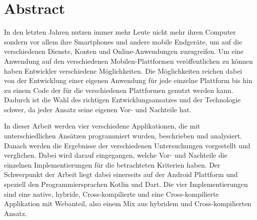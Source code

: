 \chapter*{Abstract}

\bigskip 

In den letzten Jahren nutzen immer mehr Leute nicht mehr ihren Computer sondern vor allem ihre Smartphones und andere mobile Endgeräte, um auf die verschiedenen Dienste, Konten und Online-Anwendungen zuzugreifen. Um eine Anwendung auf den verschiedenen Mobilen-Plattformen veröffentlichen zu können haben Entwickler verschiedene Möglichkeiten. Die Möglichkeiten reichen dabei von der Entwicklung einer eigenen Anwendung für jede einzelne Plattform bis hin zu einem Code der für die verschiedenen Plattformen genutzt werden kann. Dadurch ist die Wahl des richtigen Entwicklungsansatzes und der Technologie schwer, da jeder Ansatz seine eigenen Vor- und Nachteile hat. 

In dieser Arbeit werden vier verschiedene Applikationen, die mit unterschiedlichen Ansätzen programmiert wurden, beschrieben und analysiert. Danach werden die Ergebnisse der verschiedenen Untersuchungen vorgestellt und verglichen. Dabei wird darauf eingegangen, welche Vor- und Nachteile die einzelnen Implementierungen für die betrachteten Kriterien haben. Der Schwerpunkt der Arbeit liegt dabei einerseits auf der Android Plattform und speziell den Programmiersprachen Kotlin und Dart. Die vier Implementierungen sind eine native, hybride, Cross-kompilierte und eine Cross-kompilierte Applikation mit Webanteil, also einem Mix aus hybridem und Cross-kompilierten Ansatz.